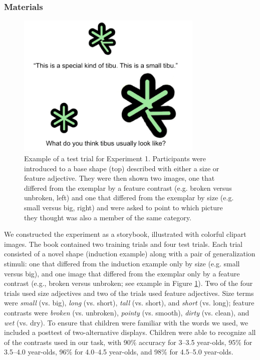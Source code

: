 \documentclass[man]{apa2}
\begin{document}
\subsubsection{Materials}

\begin{figure}[t]
  \begin{center} 
    \includegraphics[width=3.5in]{figures/inanimate_demo.png} 
    \caption{\label{fig:inanimate_demo} Example of a test trial for Experiment 1.  Participants were introduced to a base shape (top) described with either a size or feature adjective.  They were then shown two images, one that differed from the exemplar by a feature contrast (e.g. broken versus unbroken, left) and one that differed from the exemplar by size (e.g. small versus big, right) and were asked to point to which picture they thought was also a member of the same category. } 
  \end{center} 
\end{figure}	

We constructed the experiment as a storybook, illustrated with colorful clipart images. The book contained two training trials and four test trials. Each trial consisted of a novel shape (induction example) along with a pair of generalization stimuli: one that differed from the induction example only by size (e.g. small versus big), and one image that differed from the exemplar only by a feature contrast (e.g., broken versus unbroken; see example in Figure \ref{fig:inanimate_demo}). Two of the four trials used size adjectives and two of the trials used feature adjectives.
Size terms were \emph{small} (vs. big), \emph{long} (vs. short), \emph{tall} (vs. short), and \emph{short} (vs. long);  feature contrasts were \emph{broken} (vs. unbroken), \emph{pointy} (vs. smooth), \emph{dirty} (vs. clean), and \emph{wet} (vs. dry).  To ensure that children were familiar with the words we used, we included a posttest of two-alternative displays.  Children were able to recognize all of the contrasts used in our task, with 90\% accuracy for 3--3.5 year-olds, 95\% for 3.5--4.0 year-olds, 96\% for 4.0--4.5 year-olds, and 98\% for 4.5--5.0 year-olds.  
\end{document}
